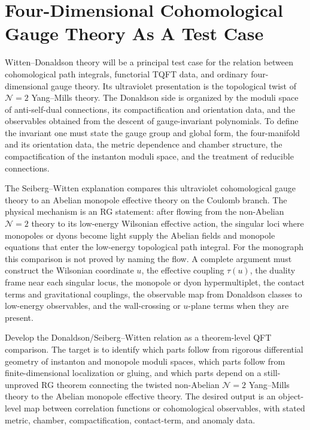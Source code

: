 \section{Four-Dimensional Cohomological Gauge Theory As A Test Case}

Witten--Donaldson theory will be a principal test case for the relation
between cohomological path integrals, functorial TQFT data, and ordinary
four-dimensional gauge theory.  Its ultraviolet presentation is the
topological twist of \(\mathcal N=2\) Yang--Mills theory.  The Donaldson side
is organized by the moduli space of anti-self-dual connections, its
compactification and orientation data, and the observables obtained from the
descent of gauge-invariant polynomials.  To define the invariant one must
state the gauge group and global form, the four-manifold and its orientation
data, the metric dependence and chamber structure, the compactification of
the instanton moduli space, and the treatment of reducible connections.

The Seiberg--Witten explanation compares this ultraviolet cohomological gauge
theory to an Abelian monopole effective theory on the Coulomb branch.  The
physical mechanism is an RG statement: after flowing from the non-Abelian
\(\mathcal N=2\) theory to its low-energy Wilsonian effective action, the
singular loci where monopoles or dyons become light supply the Abelian fields
and monopole equations that enter the low-energy topological path integral.
For the monograph this comparison is not proved by naming the flow.  A
complete argument must construct the Wilsonian coordinate \(u\), the effective
coupling \(\tau(u)\), the duality frame near each singular locus, the
monopole or dyon hypermultiplet, the contact terms and gravitational
couplings, the observable map from Donaldson classes to low-energy
observables, and the wall-crossing or \(u\)-plane terms when they are
present.

\begin{openproblem}
\label{op:donaldson-seiberg-witten-rg-comparison}
Develop the Donaldson/Seiberg--Witten relation as a theorem-level QFT
comparison.  The target is to identify which parts follow from rigorous
differential geometry of instanton and monopole moduli spaces, which parts
follow from finite-dimensional localization or gluing, and which parts depend
on a still-unproved RG theorem connecting the twisted non-Abelian
\(\mathcal N=2\) Yang--Mills theory to the Abelian monopole effective theory.
The desired output is an object-level map between correlation functions or
cohomological observables, with stated metric, chamber, compactification,
contact-term, and anomaly data.
\end{openproblem}
